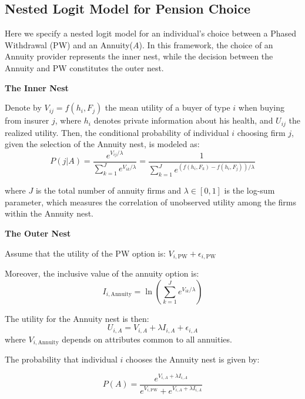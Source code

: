 \documentclass[12pt]{article}
\theoremstyle{plain}
\theoremstyle{plain}
\begin{document}
\subsection*{Nested Logit Model for Pension Choice}

Here we specify a nested logit model for an individual's choice between a Phased Withdrawal (PW) and an Annuity($A$). In this framework, the choice of an Annuity provider represents the inner nest, while the  decision between the Annuity and PW constitutes the outer nest.

\textbf{The Inner Nest}

Denote by $V_{ij} = f(h_i, F_j)$ the mean utility of a buyer of type $i$ when buying from insurer $j$, where $h_i$ denotes private information about his health, and $U_{ij}$ the realized utility. Then, the conditional probability of individual $i$ choosing firm $j$, given the selection of the Annuity nest, is modeled as:
\begin{equation}\label{eq:inner_prob}
    P(j|A) = \frac{e^{V_{ij} / \lambda}}{\sum_{k=1}^{J} e^{V_{ik} / \lambda}} = \frac{1}{\sum_{k=1}^{J} e^{(f(h_i, F_k)-f(h_i, F_j)) / \lambda}}
\end{equation}

where $J$ is the total number of annuity firms and $\lambda\in[0,1]$ is the log-sum parameter, which measures the correlation of unobserved utility among the firms within the Annuity nest. 


\textbf{The Outer Nest}

Assume that the utility of the PW option is: $V_{i, \text{PW}} + \epsilon_{i, \text{PW}}$

Moreover, the inclusive value of the annuity option is: 
\begin{equation}
    I_{i, \text{Annuity}} = \ln\left(\sum_{k=1}^{J} e^{V_{ik} / \lambda}\right)
\end{equation}

The utility for the Annuity nest is then:
\begin{equation}
    U_{i, A} = V_{i, A} + \lambda I_{i, A} + \epsilon_{i, A}
\end{equation}
where $V_{i, \text{Annuity}}$ depends on attributes common to all annuities.


The probability that individual $i$ chooses the Annuity nest is given by:

\begin{equation}
    P(A) = \frac{e^{V_{i,A} + \lambda I_{i, A}}}{e^{V_{i, \text{PW}}} + e^{V_{i, A} + \lambda I_{i, A}}}
\end{equation}
\end{document}
